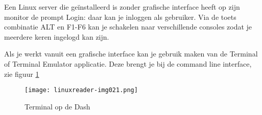 Een Linux server die ge\"installeerd is zonder grafische interface heeft op zijn monitor de prompt Login: daar kan je
inloggen als gebruiker. Via de toets combinatie ALT en F1-F6 kan je schakelen naar verschillende consoles zodat je
meerdere keren ingelogd kan zijn.

Als je werkt vanuit een grafische interface kan je gebruik maken van de Terminal of Terminal Emulator applicatie. Deze brengt je bij de command line interface, zie figuur \ref{fig:DashTerminal}

\begin{figure}
\texttt{[image: linuxreader-img021.png]}
	\label{fig:DashTerminal}
	\caption{Terminal op de Dash}
\end{figure}

